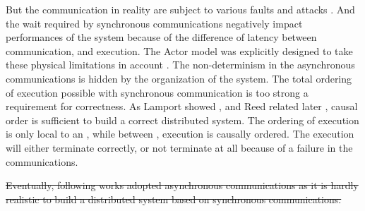 But the communication in reality are subject to various faults and attacks \cite{Lamport1982}.
And the wait required by synchronous communications negatively impact performances of the system because of the difference of latency between communication, and execution.
The Actor model was explicitly designed to take these physical limitations in account \cite{Hewitt1977a}.
The non-determinism in the asynchronous communications is hidden by the organization of the system.
The total ordering of execution possible with synchronous communication is too strong a requirement for correctness.
As Lamport showed \cite{Lamport1978}, and Reed related later \cite{Reed2012}, causal order is sufficient to build a correct distributed system.
The ordering of execution is only local to an , while between , execution is causally ordered.
The execution will either terminate correctly, or not terminate at all because of a failure in the communications.

\sout{Eventually, following works adopted asynchronous communications as it is hardly realistic to build a distributed system based on synchronous communications.}















